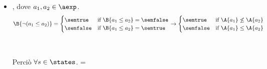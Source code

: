 {\begin{enumerate}[label=\alph*)]
\begin{itemize}
    \item {}, dove $a_1, a_2 \in \aexp$. \\
      \begin{align*} 
       \B{\lnot(a_1 \leq a_2)} = 
        \begin{cases}
        \semtrue &
        \mbox{if} \ \B{a_1 \leq a_2} = \semfalse \\
        \semfalse & 
        \mbox{if} \ \B{a_1 \leq a_2} = \semtrue \\
        \end{cases} 
        \rightarrow
        \begin{cases} 
        \semtrue & 
        \mbox{if} \ \A{a_1} \not \leq \A{a_2}\\ 
        \semfalse & 
        \mbox{if} \ \A{a_1} \leq \A{a_2}\\
        \end{cases} 
      \end{align*} \\ \\
      Perciò $\forall s \in \states$. =  \\


\end{itemize}
\end{enumerate}}
